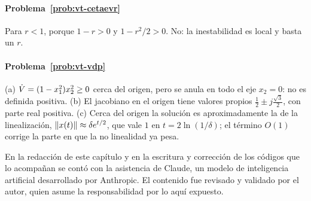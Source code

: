 \paragraph{Problema~\ref{prob:vt-cetaevr}}
Para $r<1$, porque $1-r>0$ y $1-r^2/2>0$. No: la inestabilidad es local y basta un $r$.

\paragraph{Problema~\ref{prob:vt-vdp}}
(a) $\dot V=(1-x_1^2)x_2^2\ge0$ cerca del origen, pero se anula en todo el eje $x_2=0$: no es definida positiva. (b) El jacobiano en el origen tiene valores propios $\tfrac12\pm j\tfrac{\sqrt3}2$, con parte real positiva. (c) Cerca del origen la solución es aproximadamente la de la linealización, $\left\lVert x(t)\right\rVert\approx\delta e^{t/2}$, que vale $1$ en $t=2\ln(1/\delta)$; el término $O(1)$ corrige la parte en que la no linealidad ya pesa.

\respuestaspausas

\begin{parallevar}
En la redacción de este capítulo y en la escritura y corrección de los códigos que lo acompañan se contó con la asistencia de Claude, un modelo de inteligencia artificial desarrollado por Anthropic. El contenido fue revisado y validado por el autor, quien asume la responsabilidad por lo aquí expuesto.
\end{parallevar}
